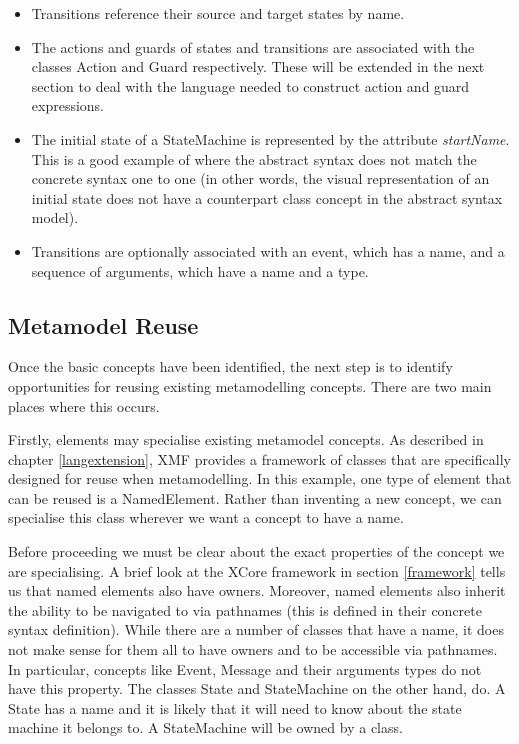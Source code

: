 \begin{itemize}
\item Transitions reference their source and target states by
name. \item The actions and guards of states and transitions are
associated with the classes Action and Guard respectively. These
will be extended in the next section to deal with the language
needed to construct action and guard expressions. \item The
initial state of a StateMachine is represented by the attribute
{\em startName}. This is a good example of where the abstract
syntax does not match the concrete syntax one to one (in other
words, the visual representation of an initial state does not have
a counterpart class concept in the abstract syntax model). \item
Transitions are optionally associated with an event, which has a
name, and a sequence of arguments, which have a name and a type.
\end{itemize}

\subsection{Metamodel Reuse}

Once the basic concepts have been identified, the next step is to
identify opportunities for reusing existing metamodelling
concepts. There are two main places where this occurs.

Firstly, elements may specialise existing metamodel concepts. As
described in chapter \ref{langextension}, XMF provides a framework
of classes that are specifically designed for reuse when
metamodelling. In this example, one type of element that can be
reused is a NamedElement. Rather than inventing a new concept, we
can specialise this class wherever we want a concept to have a
name.

Before proceeding we must be clear about the exact properties of
the concept we are specialising. A brief look at the XCore
framework in section \ref{framework} tells us that named elements
also have owners. Moreover, named elements also inherit the
ability to be navigated to via pathnames (this is defined in their
concrete syntax definition). While there are a number of classes
that have a name, it does not make sense for them all to have
owners and to be accessible via pathnames. In particular, concepts
like Event, Message and their arguments types do not have this
property. The classes State and StateMachine on the other hand,
do. A State has a name and it is likely that it will need to know
about the state machine it belongs to. A StateMachine will be
owned by a class.

